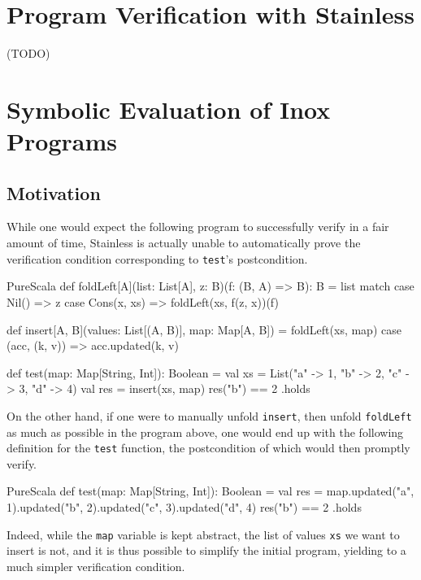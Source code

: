 \documentclass[a4paper,twoside]{article}
\newcommand{\TODO}[1]{\textcolor{YellowOrange}{(TODO)}} %
\newcommand{\stt}[1]{\texttt{\small{#1}}}
\begin{document}
\clearpage

\section{Program Verification with Stainless}
\label{verif}

\TODO{Describe Stainless/Inox pipeline}


\clearpage
\section{Symbolic Evaluation of Inox Programs}
\label{symbolic}

\subsection{Motivation}

While one would expect the following program to successfully verify in a fair amount of time, Stainless is actually unable to automatically prove the verification condition corresponding to \stt{test}'s postcondition.

\begin{ShortCode}{PureScala}
def foldLeft[A](list: List[A], z: B)(f: (B, A) => B): B = list match {
  case Nil() => z
  case Cons(x, xs) => foldLeft(xs, f(z, x))(f)
}

def insert[A, B](values: List[(A, B)], map: Map[A, B]) = {
  foldLeft(xs, map) {
    case (acc, (k, v)) => acc.updated(k, v)
  }
}

def test(map: Map[String, Int]): Boolean = {
  val xs = List("a" -> 1, "b" -> 2, "c" -> 3, "d" -> 4)
  val res = insert(xs, map)
  res("b") == 2
}.holds
\end{ShortCode}

On the other hand, if one were to manually unfold \stt{insert}, then unfold \stt{foldLeft} as much as possible in the program above, one would end up with the following definition for the \stt{test} function, the postcondition of which would then promptly verify.

\begin{ShortCode}{PureScala}
def test(map: Map[String, Int]): Boolean = {
  val res = map.updated("a", 1).updated("b", 2).updated("c", 3).updated("d", 4)
  res("b") == 2
}.holds
\end{ShortCode}

Indeed, while the \stt{map} variable is kept abstract, the list of values \stt{xs} we want to insert is not, and it is thus possible to simplify the initial program, yielding to a much simpler verification condition.\\
\end{document}
